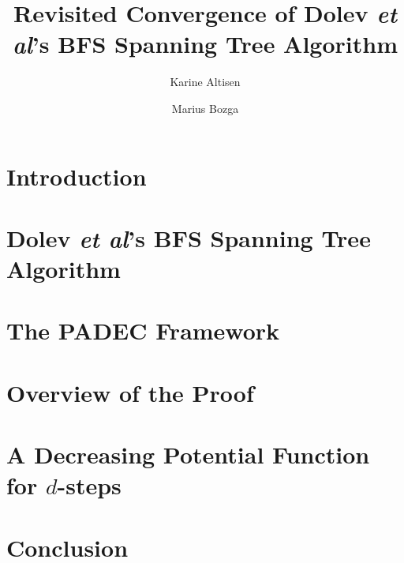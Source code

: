 \documentclass[runningheads]{llncs}
\begin{document}
\title{Revisited Convergence of Dolev \emph{et al}’s BFS Spanning Tree
  Algorithm}

\author{Karine Altisen \and
  Marius Bozga}



\maketitle

\begin{abstract}
  
\end{abstract}

\section{Introduction}
\label{sec:introduction}


\section{Dolev \emph{et al}'s BFS Spanning Tree Algorithm}
\label{sec:dolev}


\section{The PADEC Framework}
\label{sec:padec}


\section{Overview of the Proof}
\label{sec:proof}


\section{A Decreasing Potential Function for $d$-steps}
\label{sec:dstep-potential}


\section{Conclusion}
\label{sec:conclusion}




\end{document}
